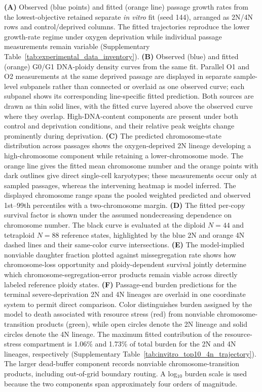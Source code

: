 \documentclass[11pt]{article}
\begin{document}
\noindent\textbf{(A)} Observed (blue points) and fitted (orange line) passage growth rates from the lowest-objective retained separate \textit{in vitro} fit (seed 144), arranged as 2N/4N rows and control/deprived columns. The fitted trajectories reproduce the lower growth-rate regime under oxygen deprivation while individual passage measurements remain variable (Supplementary Table~\ref{tab:experimental_data_inventory}).
\textbf{(B)} Observed (blue) and fitted (orange) G0/G1 DNA-ploidy density curves from the same fit. Parallel O1 and O2 measurements at the same deprived passage are displayed in separate sample-level subpanels rather than connected or overlaid as one observed curve; each subpanel shows its corresponding line-specific fitted prediction. Both sources are drawn as thin solid lines, with the fitted curve layered above the observed curve where they overlap. High-DNA-content components are present under both control and deprivation conditions, and their relative peak weights change prominently during deprivation.
\textbf{(C)} The predicted chromosome-state distribution across passages shows the oxygen-deprived 2N lineage developing a high-chromosome component while retaining a lower-chromosome mode. The orange line gives the fitted mean chromosome number and the orange points with dark outlines give direct single-cell karyotypes; these measurements occur only at sampled passages, whereas the intervening heatmap is model inferred. The displayed chromosome range spans the pooled weighted predicted and observed 1st--99th percentiles with a two-chromosome margin.
\textbf{(D)} The fitted per-copy survival factor is shown under the assumed nondecreasing dependence on chromosome number. The black curve is evaluated at the diploid \(N=44\) and tetraploid \(N=88\) reference states, highlighted by the blue 2N and orange 4N dashed lines and their same-color curve intersections.
\textbf{(E)} The model-implied nonviable daughter fraction plotted against missegregation rate shows how chromosome-loss opportunity and ploidy-dependent survival jointly determine which chromosome-segregation-error products remain viable across directly labeled reference ploidy states.
\textbf{(F)} Passage-end burden predictions for the terminal severe-deprivation 2N and 4N lineages are overlaid in one coordinate system to permit direct comparison. Color distinguishes burden assigned by the model to death associated with resource stress (red) from nonviable chromosome-transition products (green), while open circles denote the 2N lineage and solid circles denote the 4N lineage. The maximum fitted contribution of the resource-stress compartment is 1.06\% and 1.73\% of total burden for the 2N and 4N lineages, respectively (Supplementary Table~\ref{tab:invitro_top10_4n_trajectory}). The larger dead-buffer component records nonviable chromosome-transition products, including out-of-grid boundary routing. A log$_{10}$ burden scale is used because the two components span approximately four orders of magnitude.
\end{document}

